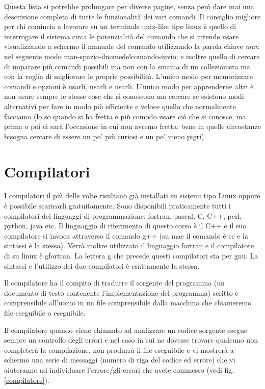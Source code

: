 \documentclass[11pt,fleqn]{book} %
\begin{document}
Questa lista si potrebbe prolungare per diverse pagine, senza però dare mai una descrizione completa di tutte le funzionalità dei vari comandi. Il consiglio migliore per chi comincia a lavorare su un terminale unix-like tipo linux è  quello di interrogare il sistema circa le potenzialità del comando che si intende usare visualizzando a schermo il manuale del comando utilizzando la parola chiave \textit{man} nel seguente modo man-spazio-ilnomedelcomando-invio; e inoltre quello di cercare di imparare più comandi possibili ma non con la smania di un collezionista ma con la voglia di migliorare le proprie possibilità. L'unico modo per memorizzare comandi e opzioni è usarli, usarli e usarli. L'unico modo per apprenderne altri è non usare sempre le stesse cose che si conoscono ma cercare se esistono modi alternativi per fare in modo più efficiente e veloce quello che normalmente facciamo (lo so quando si ha fretta è più comodo usare ciò che si conosce, ma prima o poi ci sarà l'occasione in cui non avremo fretta: bene in quelle circostanze  bisogna cercare di essere un po' più curiosi e un po' meno pigri).

\section{Compilatori}

I compilatori il più delle volte risultano già installati su sistemi tipo Linux oppure è possibile scaricarli gratuitamente. Sono disponibili praticamente tutti i compilatori dei linguaggi di programmazione: fortran, pascal, C, C++, perl, python, java etc.
Il linguaggio di riferimento di questo corso è il C++ e il suo compilatore si invoca attraverso il comando g++ (su mac il comando è cc e la sintassi è la stessa). Verrà inoltre utilizzato il linguaggio fortran e il compilatore di su linux è gfortran. La lettera g che precede questi compilatori sta per gnu.
La sintassi e l'utilizzo dei due compilatori è esattamente la stessa. 

Il compilatore ha il compito di tradurre il sorgente del programma (un documento di testo contenente l'implementazione del programma) scritto e comprensibile all'uomo in un file comprensibile dalla macchina che chiameremo file eseguibile o eseguibile.

Il compilatore quando viene chiamato ad analizzare un codice sorgente esegue sempre un controllo degli errori e nel caso in cui ne dovesse trovare qualcuno non completerà la compilazione, non produrrà il file eseguibile e vi mostrerà a schermo una serie di messaggi (numero di riga del codice ed errore) che vi aiuteranno ad individuare l'errore/gli errori che avete commesso (vedi fig. \ref{compilatore}).
\end{document}
